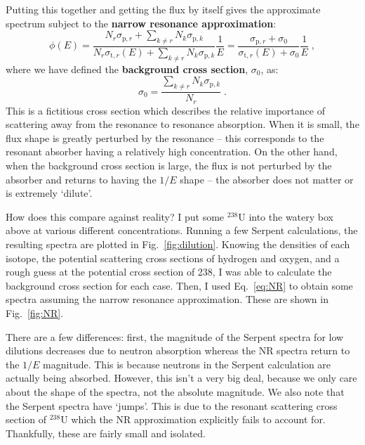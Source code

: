 \documentclass{article}
\begin{document}
Putting this together and getting the flux by itself gives the approximate spectrum subject to the \textbf{narrow resonance approximation}:
\begin{equation}\label{eq:NR}
    \phi(E) = \frac{N_r\sigma_{\mathrm{p},r}+\sum_{k\neq r}N_k\sigma_{\mathrm{p},k}}{N_r\sigma_{\mathrm{t},r}(E) + \sum_{k\neq r}N_k\sigma_{\mathrm{p},k}}\frac{1}{E} = \frac{\sigma_{\mathrm{p},r}+\sigma_0}{\sigma_{\mathrm{t},r}(E) + \sigma_{0}}\frac{1}{E}\;\mathrm{,}
\end{equation}
where we have defined the \textbf{background cross section}, $\sigma_0$, as:
\begin{equation}
    \sigma_0 = \frac{\sum_{k\neq r}N_k\sigma_{\mathrm{p},k}}{N_r}\;\mathrm{.}
\end{equation}
This is a fictitious cross section which describes the relative importance of scattering away from the resonance to resonance absorption. When it is small, the flux shape is greatly perturbed by the resonance -- this corresponds to the resonant absorber having a relatively high concentration. On the other hand, when the background cross section is large, the flux is not perturbed by the absorber and returns to having the $1/E$ shape -- the absorber does not matter or is extremely `dilute'.

How does this compare against reality? I put some $^{238}$U into the watery box above at various different concentrations. Running a few Serpent calculations, the resulting spectra are plotted in Fig.~\ref{fig:dilution}. Knowing the densities of each isotope, the potential scattering cross sections of hydrogen and oxygen, and a rough guess at the potential cross section of 238, I was able to calculate the background cross section for each case. Then, I used Eq.~\eqref{eq:NR} to obtain some spectra assuming the narrow resonance approximation. These are shown in Fig.~\ref{fig:NR}. 

There are a few differences: first, the magnitude of the Serpent spectra for low dilutions decreases due to neutron absorption whereas the NR spectra return to the $1/E$ magnitude. This is because neutrons in the Serpent calculation are actually being absorbed. However, this isn't a very big deal, because we only care about the shape of the spectra, not the absolute magnitude. We also note that the Serpent spectra have `jumps'. This is due to the resonant scattering cross section of $^{238}$U which the NR approximation explicitly fails to account for. Thankfully, these are fairly small and isolated.
\end{document}
